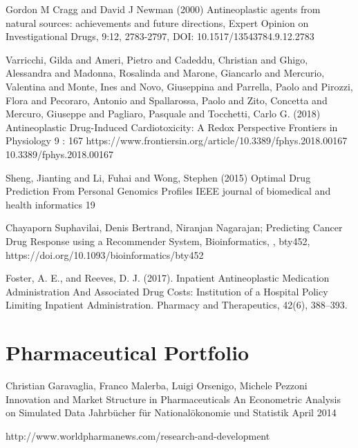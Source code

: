 \begin{thebibliography}{00}
Gordon M Cragg and David J Newman (2000) 
\newblock Antineoplastic agents from natural sources: achievements and future directions, 
\newblock Expert Opinion on Investigational Drugs, 9:12, 2783-2797, DOI: 10.1517/13543784.9.12.2783

Varricchi, Gilda and Ameri, Pietro and Cadeddu, Christian and Ghigo, Alessandra and Madonna, Rosalinda and Marone, Giancarlo and Mercurio, Valentina and Monte, Ines and Novo, Giuseppina and Parrella, Paolo and Pirozzi, Flora and Pecoraro, Antonio and Spallarossa, Paolo and Zito, Concetta and Mercuro, Giuseppe and Pagliaro, Pasquale and Tocchetti, Carlo G. (2018)  
\newblock Antineoplastic Drug-Induced Cardiotoxicity: A Redox Perspective 
\newblock Frontiers in Physiology 9 : 167  https://www.frontiersin.org/article/10.3389/fphys.2018.00167 10.3389/fphys.2018.00167

Sheng, Jianting and Li, Fuhai and Wong, Stephen (2015)
\newblock Optimal Drug Prediction From Personal Genomics Profiles
\newblock IEEE journal of biomedical and health informatics 19

 Chayaporn Suphavilai, Denis Bertrand, Niranjan Nagarajan; 
\newblock Predicting Cancer Drug Response using a Recommender System, 
\newblock Bioinformatics, , bty452, https://doi.org/10.1093/bioinformatics/bty452

Foster, A. E., and Reeves, D. J. (2017). 
\newblock Inpatient Antineoplastic Medication Administration And Associated Drug Costs: Institution of a Hospital Policy Limiting Inpatient Administration. 
\newblock Pharmacy and Therapeutics, 42(6), 388–393.

\section{Pharmaceutical Portfolio}

 Christian Garavaglia, Franco Malerba, Luigi Orsenigo, Michele Pezzoni
\newblock Innovation and Market Structure in Pharmaceuticals An Econometric Analysis on Simulated Data
\newblock Jahrbücher für Nationalökonomie und Statistik April 2014

 http://www.worldpharmanews.com/research-and-development


\end{thebibliography}

